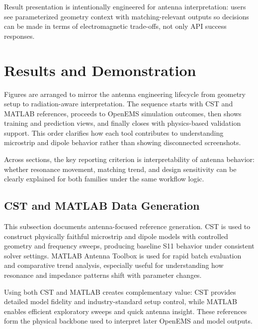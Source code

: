 \documentclass[12pt,a4paper]{article}
\begin{document}
Result presentation is intentionally engineered for antenna interpretation: users see parameterized geometry context with matching-relevant outputs so decisions can be made in terms of electromagnetic trade-offs, not only API success responses.

\section{Results and Demonstration}
Figures are arranged to mirror the antenna engineering lifecycle from geometry setup to radiation-aware interpretation. The sequence starts with CST and MATLAB references, proceeds to OpenEMS simulation outcomes, then shows training and prediction views, and finally closes with physics-based validation support. This order clarifies how each tool contributes to understanding microstrip and dipole behavior rather than showing disconnected screenshots.

Across sections, the key reporting criterion is interpretability of antenna behavior: whether resonance movement, matching trend, and design sensitivity can be clearly explained for both families under the same workflow logic.

\subsection{CST and MATLAB Data Generation}
This subsection documents antenna-focused reference generation. CST is used to construct physically faithful microstrip and dipole models with controlled geometry and frequency sweeps, producing baseline S11 behavior under consistent solver settings. MATLAB Antenna Toolbox is used for rapid batch evaluation and comparative trend analysis, especially useful for understanding how resonance and impedance patterns shift with parameter changes.

Using both CST and MATLAB creates complementary value: CST provides detailed model fidelity and industry-standard setup control, while MATLAB enables efficient exploratory sweeps and quick antenna insight. These references form the physical backbone used to interpret later OpenEMS and model outputs.
\end{document}

